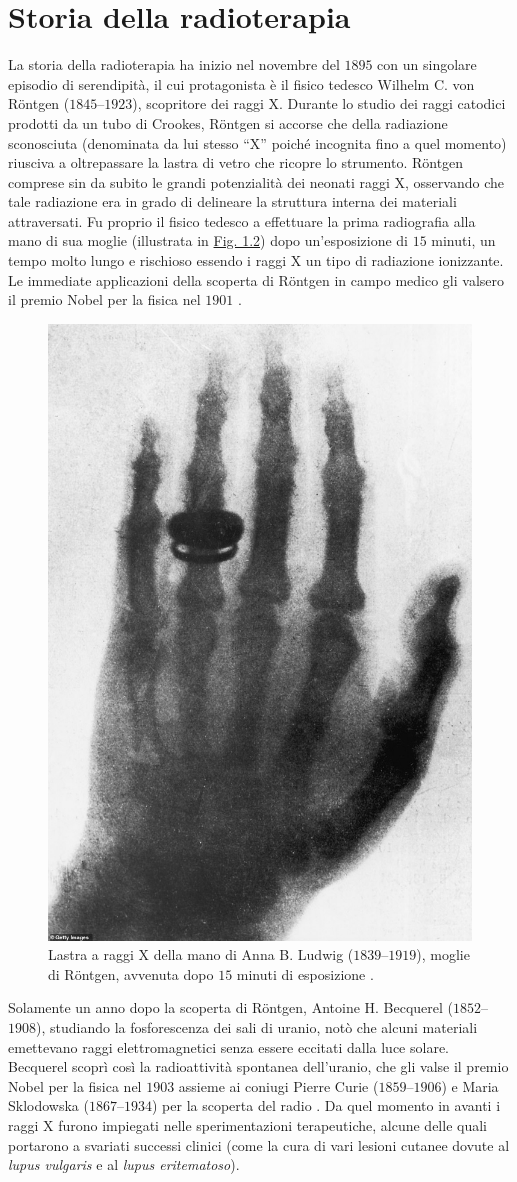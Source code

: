 \documentclass[12pt,a4paper,twoside]{report}
\begin{document}
	\section{Storia della radioterapia}
	La storia della radioterapia ha inizio nel novembre del $1895$ con un singolare episodio di serendipità, il cui protagonista è il fisico tedesco Wilhelm C. von Röntgen ($1845$--$1923$), scopritore dei raggi X. Durante lo studio dei raggi catodici prodotti da un tubo di Crookes, Röntgen si accorse che della radiazione sconosciuta (denominata da lui stesso ``X'' poiché incognita fino a quel momento) riusciva a oltrepassare la lastra di vetro che ricopre lo strumento. Röntgen comprese sin da subito le grandi potenzialità dei neonati raggi X, osservando che tale radiazione era in grado di delineare la struttura interna dei materiali attraversati. Fu proprio il fisico tedesco a effettuare la prima radiografia alla mano di sua moglie (illustrata in \hyperref[fig:rongten]{Fig. 1.2}) dopo un'esposizione di $15$ minuti, un tempo molto lungo e rischioso essendo i raggi X un tipo di radiazione ionizzante. Le immediate applicazioni della scoperta di Röntgen in campo medico gli valsero il premio Nobel per la fisica nel $1901$ \cite{rontgen}.
	\begin{figure}[H]
		\centering
		\includegraphics[width=0.4\linewidth]{rongten.jpg}
		\caption{Lastra a raggi X della mano di Anna B. Ludwig ($1839$--$1919$), moglie di Röntgen, avvenuta dopo $15$ minuti di esposizione \cite{hand_rongt_wife}.}
		\label{fig:rongten}
	\end{figure}
	Solamente un anno dopo la scoperta di Röntgen, Antoine H. Becquerel ($1852$--$1908$), studiando la fosforescenza dei sali di uranio, notò che alcuni materiali emettevano raggi elettromagnetici senza essere eccitati dalla luce solare. Becquerel scoprì così la radioattività spontanea dell'uranio, che gli valse il premio Nobel per la fisica nel $1903$ assieme ai coniugi Pierre Curie ($1859$--$1906$) e Maria Sklodowska ($1867$--$1934$) per la scoperta del radio . Da quel momento in avanti i raggi X furono impiegati nelle sperimentazioni terapeutiche, alcune delle quali portarono a svariati successi clinici (come la cura di vari lesioni cutanee dovute al \textit{lupus vulgaris} e al \textit{lupus eritematoso}).
	
\end{document}
